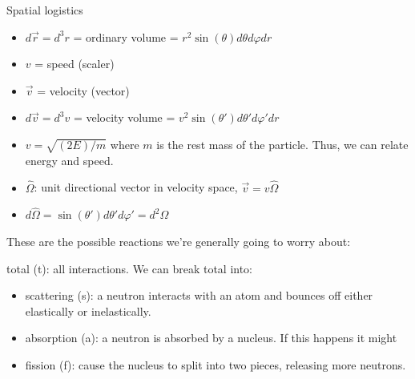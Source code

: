 \documentclass[12pt]{article}
\newcommand{\vOmega}{\ensuremath{\hat{\Omega}}}
\begin{document}
Spatial logistics
\begin{itemize}
\item $d\vec{r} = d^3r$ = ordinary volume = $r^2 \sin(\theta) d\theta d\varphi dr$
%
\item $v$ = speed (scaler)
\item $\vec{v}$ = velocity (vector)
\item $d\vec{v} = d^3v$ = velocity volume = $v^2 \sin(\theta')d\theta' d\varphi' dr$
\item $v = \sqrt{(2E)/m}$ where $m$ is the rest mass of the particle. Thus, we can relate energy and speed.

\item $\vOmega$: unit directional vector in velocity space, $\vec{v} = v\vOmega$
\item $d\vOmega = \sin(\theta')d\theta' d\varphi' =  d^2\Omega$
\end{itemize}

These are the possible reactions we're generally going to worry about:

\hspace*{1em}total (t): all interactions. We can break total into:
\begin{itemize}
\item scattering (s): a neutron interacts with an atom and bounces off either elastically or inelastically.
\item absorption (a): a neutron is absorbed by a nucleus. If this happens it might
\item fission (f): cause the nucleus to split into two pieces, releasing more neutrons.
\end{itemize}
\end{document}
